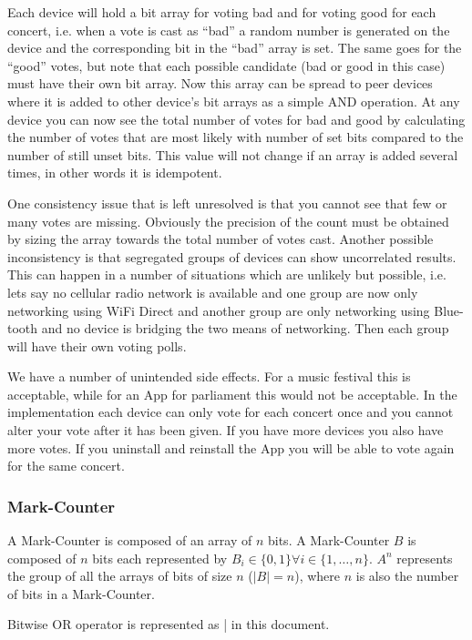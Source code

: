 Each device will hold a bit array for voting bad and for voting good for each concert, i.e. when a vote is cast as ``bad'' a random number is generated on the device and the corresponding bit in the ``bad'' array is set. The same goes for the ``good'' votes, but note that each possible candidate (bad or good in this case) must have their own bit array. Now this array can be spread to peer devices where it is added to other device\textquoteright s bit arrays as a simple AND operation. At any device you can now see the total number of votes for bad and good by calculating the number of votes that are most likely with number of set bits compared to the number of still unset bits. This value will not change if an array is added several times, in other words it is idempotent. 

One consistency issue that is left unresolved is that you cannot see that few or many votes are missing. Obviously the precision of the count must be obtained by sizing the array towards the total number of votes cast. Another possible inconsistency is that segregated groups of devices can show uncorrelated results. This can happen in a number of situations which are unlikely but possible, i.e. lets say no cellular radio network is available and one group are now only networking using WiFi Direct and another group are only networking using Blue-tooth and no device is bridging the two means of networking. Then each group will have their own voting polls.

We have a number of unintended side effects. For a music festival this is acceptable, while for an App for parliament this would not be acceptable. In the implementation each device can only vote for each concert once and you cannot alter your vote after it has been given. If you have more devices you also have more votes. If you uninstall and reinstall the App you will be able to vote again for the same concert.

\subsubsection{Mark-Counter}
A Mark-Counter is composed of an array of $n$ bits. A Mark-Counter $B$ is composed of $n$ bits each represented by $B_{i} \in \{0, 1\} \forall i \in \{1,\dots, n\}$. $A^{n}$ represents the group of all the arrays of bits of size $n$ ($|B| = n$), where $n$ is also the number of bits in a Mark-Counter.

Bitwise OR operator is represented as | in this document.

